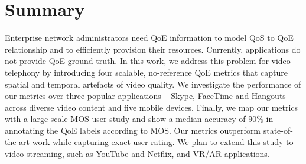 \section{Summary}
Enterprise network administrators need QoE information to model QoS to QoE relationship and to efficiently provision their resources. Currently, applications do not provide QoE ground-truth. In this work, we address this problem for video telephony by introducing four scalable, no-reference QoE metrics that capture spatial and temporal artefacts of video quality. We investigate the performance of our metrics over three popular applications -- Skype, FaceTime and Hangouts -- across diverse video content and five mobile devices. Finally, we map our metrics with a large-scale MOS user-study and show a median accuracy of 90\% in annotating the QoE labels according to MOS. Our metrics outperform state-of-the-art work while capturing exact user rating. We plan to extend this study to video streaming, such as YouTube and Netflix, and VR/AR applications.
